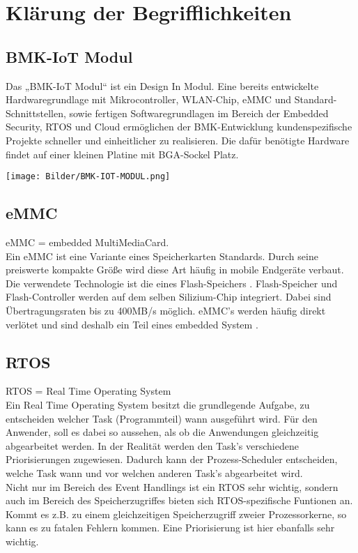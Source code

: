 

\section{Klärung der Begrifflichkeiten}

\subsection{BMK-IoT Modul}
Das „BMK-IoT Modul“ ist ein Design In Modul. Eine bereits entwickelte Hardwaregrundlage mit Mikrocontroller, WLAN-Chip, eMMC und Standard-Schnittstellen, sowie fertigen Softwaregrundlagen im Bereich der Embedded Security, RTOS und Cloud ermöglichen der BMK-Entwicklung kundenspezifische Projekte schneller und einheitlicher zu realisieren.
Die dafür benötigte Hardware findet auf einer kleinen Platine mit BGA-Sockel Platz. 

\begin{center}
\texttt{[image: Bilder/BMK-IOT-MODUL.png]}
\end{center}

\subsection{eMMC}
eMMC = embedded MultiMediaCard.
\\
Ein \glqq eMMC \grqq{} ist eine Variante eines Speicherkarten Standards. Durch seine preiswerte kompakte Größe wird diese Art häufig in mobile Endgeräte verbaut. Die verwendete Technologie ist die eines Flash-Speichers . Flash-Speicher und Flash-Controller werden auf dem selben Silizium-Chip integriert. Dabei sind Übertragungsraten bis zu 400MB/s möglich. eMMC's werden häufig direkt verlötet und sind deshalb ein Teil eines \glqq embedded System \grqq{}.


\subsection{RTOS}
RTOS = Real Time Operating System
\\
Ein \glqq Real Time Operating System \grqq{} besitzt die grundlegende Aufgabe, zu entscheiden welcher Task (Programmteil) wann ausgeführt wird. Für den Anwender, soll es dabei so aussehen, als ob die Anwendungen gleichzeitig abgearbeitet werden. In der Realität werden den Task's verschiedene Priorisierungen zugewiesen. Dadurch kann der Prozess-Scheduler entscheiden, welche Task wann und vor welchen anderen Task's abgearbeitet wird. 
\\
Nicht nur im Bereich des \glqq Event Handlings \grqq{} ist ein RTOS sehr wichtig, sondern auch im Bereich des Speicherzugriffes bieten sich RTOS-spezifische Funtionen an. Kommt es z.B. zu einem gleichzeitigen Speicherzugriff zweier Prozessorkerne, so kann es zu fatalen Fehlern kommen. Eine Priorisierung ist hier ebanfalls sehr wichtig.

